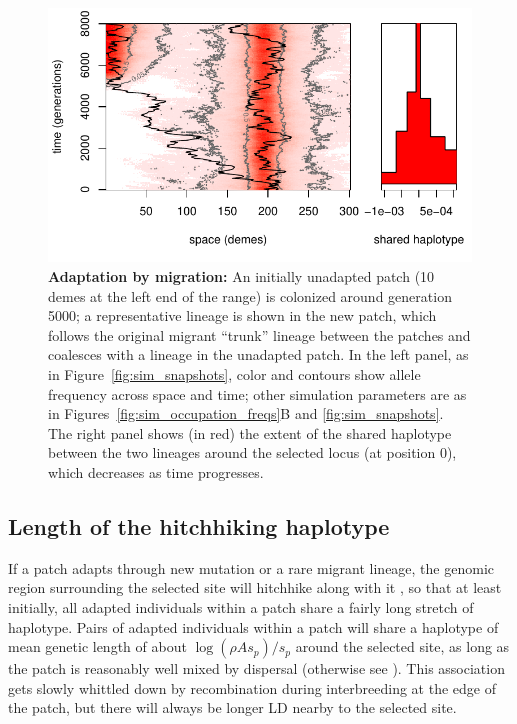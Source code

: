 \documentclass{article}
\newcommand{\citep}[1]{\cite{#1}}
\newcommand{\citet}[1]{\cite{#1}}
\begin{document}
\begin{figure}[ht]
  \begin{center}
      \includegraphics{sim-transit}
  \end{center}
  \caption{
  \textbf{Adaptation by migration:}
  An initially unadapted patch (10 demes at the left end of the range) is colonized around generation 5000;
  a representative lineage is shown in the new patch, which follows the original migrant ``trunk'' lineage
  between the patches and coalesces with a lineage in the unadapted patch.
  In the left panel, as in Figure~\ref{fig:sim_snapshots}, color and contours show allele frequency across space and time;
  other simulation parameters are as in Figures~\ref{fig:sim_occupation_freqs}B and \ref{fig:sim_snapshots}.
  The right panel shows (in red) the extent of the shared haplotype between the two lineages around the selected locus (at position 0),
  which decreases as time progresses. 
  \label{fig:lineagesmotion}
  }
\end{figure}




\subsection[Haplotypes Shared Between Patches]{Length of the hitchhiking haplotype}
\label{ss:haplotype_length}

If a patch adapts through new mutation or a rare migrant lineage, the
genomic region surrounding the selected site will hitchhike along with it \citep{maynardsmith1974hitchhiking},
so that at least initially, all adapted individuals within a patch
share a fairly long stretch of haplotype. 
Pairs of adapted individuals within a patch will share a haplotype of mean genetic length of
about $\log(\rho A s_p)/s_p$ around the selected site, 
as long as the patch is reasonably well mixed by dispersal
(otherwise see \citet{barton2013genetic}).
This association gets slowly whittled down by recombination during interbreeding at the edge of the patch,
but there will always be longer LD nearby to the selected site. 
\end{document}
